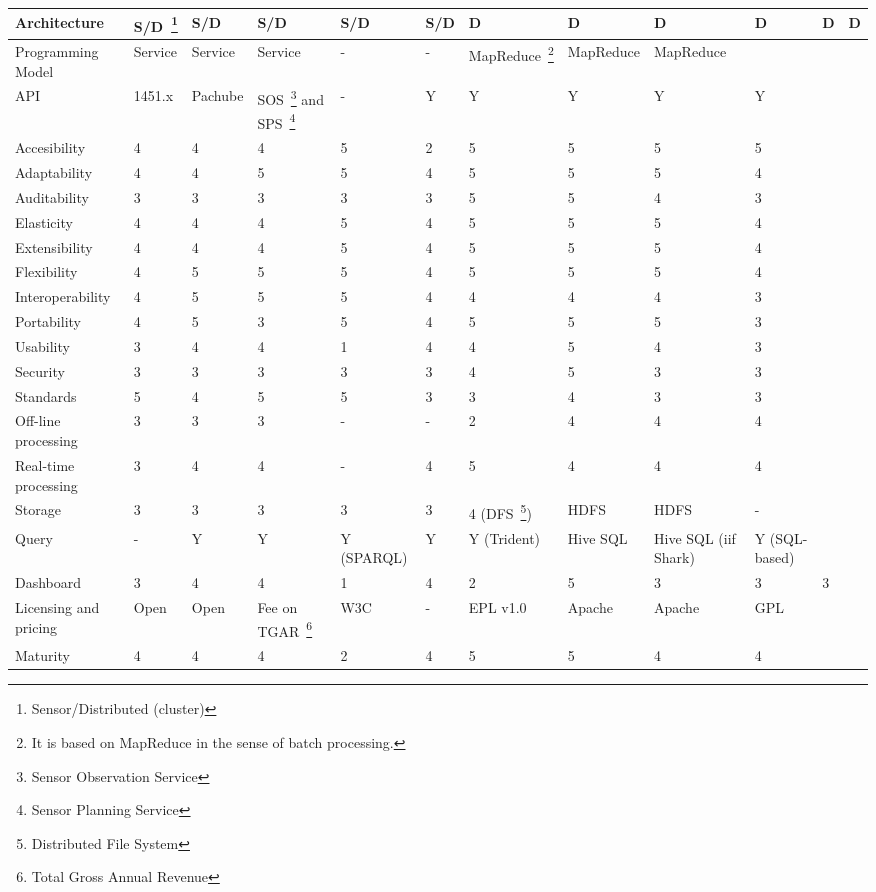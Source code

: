 \begin{sidewaystable}[!ht]
\begin{center}
\begin{tabular}[c]{|p{1.7cm}|p{1.5cm}|p{1.5cm}|p{1.5cm}|p{1.5cm}|p{1.5cm}|p{1.5cm}|p{1.5cm}|p{1.5cm}|p{1.5cm}|p{1.5cm}|p{1.5cm}|}
  Architecture & S/D~\footnote{Sensor/Distributed (cluster)} & S/D  & S/D  & S/D  & S/D & D & D & D & D  & D  & D  \\ \hline  
  Programming Model & Service & Service & Service & - & -  & MapReduce~\footnote{It is based on MapReduce in the sense of batch processing.} & MapReduce & MapReduce &  &  & \\ \hline  
  API & 1451.x & Pachube  & SOS~\footnote{Sensor Observation Service} and SPS~\footnote{Sensor Planning Service}  & - & Y & Y & Y & Y & Y  &  & \\ \hline  
  Accesibility & 4 & 4 & 4 & 5 & 2 & 5 & 5 & 5 & 5 &  & \\ \hline  
  Adaptability & 4 & 4& 5 & 5 & 4 & 5 & 5 & 5 & 4 &  & \\ \hline  
  Auditability & 3 &3 & 3 & 3 & 3 & 5 &  5& 4 & 3 &  & \\ \hline  
  Elasticity & 4 & 4& 4 & 5 & 4 & 5 & 5 & 5 &4  &  & \\ \hline  
  Extensibility & 4 & 4& 4 & 5 & 4 & 5 & 5 & 5 & 4 &  & \\ \hline  
  Flexibility &4  & 5& 5 & 5 & 4 & 5 & 5 & 5 & 4 &  & \\ \hline  
  Interoperability & 4 &5& 5 & 5 & 4 & 4 & 4 & 4& 3 &  & \\ \hline  
  Portability & 4 &5 & 3 &5  & 4 & 5 & 5 & 5 & 3 &  & \\ \hline  
  Usability & 3 &4 & 4 & 1 & 4 & 4 &5  & 4 & 3 &  & \\ \hline  
  Security & 3 & 3& 3 & 3 & 3 & 4 & 5 & 3 & 3 &  & \\ \hline  
  Standards & 5 & 4 & 5& 5 & 3 & 3 & 4 & 3 & 3 &  & \\ \hline  
  Off-line processing & 3 &3  &3 & - & - & 2 & 4 & 4 & 4 &  & \\ \hline  
  Real-time processing & 3 &4 & 4 & - & 4 & 5 & 4 & 4 & 4 &  & \\ \hline  
  Storage & 3 &3 & 3 & 3 & 3 & 4 (DFS~\footnote{Distributed File System}) & HDFS & HDFS & -  &  & \\ \hline  
  Query & - & Y& Y & Y (SPARQL) & Y  & Y (Trident) & Hive SQL & Hive SQL (iif Shark)  & Y (SQL-based) &  & \\ \hline  
  Dashboard & 3 & 4 & 4 & 1 & 4 & 2 & 5 & 3 & 3 & 3 & \\ \hline  
  Licensing and pricing & Open & Open & Fee on TGAR~\footnote{Total Gross Annual Revenue} & W3C & - & EPL v1.0 & Apache & Apache & GPL &  & \\ \hline  
  Maturity & 4 & 4&  4& 2 & 4 & 5  & 5  & 4 & 4 &  & \\ \hline  

\end{tabular}
\end{center}
\end{sidewaystable}
